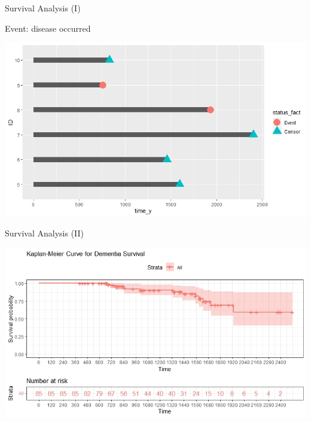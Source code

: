 \documentclass{beamer}
\begin{document}
	\begin{frame}{Survival Analysis (I)}
		
		\vspace{0.3 cm}
		Event: disease occurred
		
		\begin{center}
			\includegraphics[width=0.9\columnwidth]{survival_plot2.jpeg}
		\end{center}
	\end{frame}

	\begin{frame}{Survival Analysis (II)}
	
		\begin{center}
			\includegraphics[width=\columnwidth]{kaplan-meier_bello.jpeg}
		\end{center}
	\end{frame}
\end{document}
